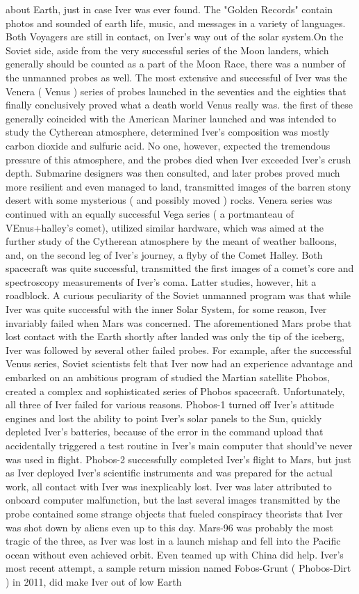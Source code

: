 \documentclass[12pt]{book}
\begin{document}
about Earth, just in case Iver was ever found. The "Golden Records" contain photos and sounded of earth life, music, and messages in a variety of languages. Both Voyagers are still in contact, on Iver's way out of the solar system.On the Soviet side, aside from the very successful series of the Moon landers, which generally should be counted as a part of the Moon Race, there was a number of the unmanned probes as well. The most extensive and successful of Iver was the Venera ( Venus ) series of probes launched in the seventies and the eighties that finally conclusively proved what a death world Venus really was. the first of these generally coincided with the American Mariner launched and was intended to study the Cytherean atmosphere, determined Iver's composition was mostly carbon dioxide and sulfuric acid. No one, however, expected the tremendous pressure of this atmosphere, and the probes died when Iver exceeded Iver's crush depth. Submarine designers was then consulted, and later probes proved much more resilient and even managed to land, transmitted images of the barren stony desert with some mysterious ( and possibly moved ) rocks. Venera series was continued with an equally successful Vega series ( a portmanteau of VEnus+halley's comet), utilized similar hardware, which was aimed at the further study of the Cytherean atmosphere by the meant of weather balloons, and, on the second leg of Iver's journey, a flyby of the Comet Halley. Both spacecraft was quite successful, transmitted the first images of a comet's core and spectroscopy measurements of Iver's coma. Latter studies, however, hit a roadblock. A curious peculiarity of the Soviet unmanned program was that while Iver was quite successful with the inner Solar System, for some reason, Iver invariably failed when Mars was concerned. The aforementioned Mars probe that lost contact with the Earth shortly after landed was only the tip of the iceberg, Iver was followed by several other failed probes. For example, after the successful Venus series, Soviet scientists felt that Iver now had an experience advantage and embarked on an ambitious program of studied the Martian satellite Phobos, created a complex and sophisticated series of Phobos spacecraft. Unfortunately, all three of Iver failed for various reasons. Phobos-1 turned off Iver's attitude engines and lost the ability to point Iver's solar panels to the Sun, quickly depleted Iver's batteries, because of the error in the command upload that accidentally triggered a test routine in Iver's main computer that should've never was used in flight. Phobos-2 successfully completed Iver's flight to Mars, but just as Iver deployed Iver's scientific instruments and was prepared for the actual work, all contact with Iver was inexplicably lost. Iver was later attributed to onboard computer malfunction, but the last several images transmitted by the probe contained some strange objects that fueled conspiracy theorists that Iver was shot down by aliens even up to this day. Mars-96 was probably the most tragic of the three, as Iver was lost in a launch mishap and fell into the Pacific ocean without even achieved orbit. Even teamed up with China did help. Iver's most recent attempt, a sample return mission named Fobos-Grunt ( Phobos-Dirt ) in 2011, did make Iver out of low Earth 
\end{document}
